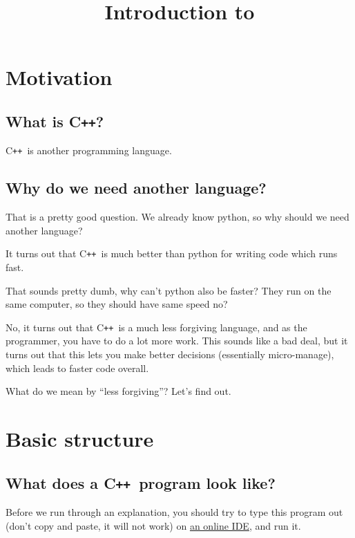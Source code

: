 \documentclass{article}
\title{Introduction to \CC}
\newcommand{\CC}{C\texttt{++}}
\begin{document}
\maketitle


\section{Motivation}

\subsection{What is \CC?}
\CC\ is another programming language.

\subsection{Why do we need another language?}
That is a pretty good question.
We already know python, so why should we need another language?

It turns out that \CC\ is much better than python for writing code which runs fast.

That sounds pretty dumb, why can't python also be faster?
They run on the same computer, so they should have same speed no?

No, it turns out that \CC\ is a much less forgiving language, and as the programmer,
you have to do a lot more work. This sounds like a bad deal, but it turns out that
this lets you make better decisions (essentially micro-manage), which leads to faster
code overall.

What do we mean by ``less forgiving''?
Let's find out.

\section{Basic structure}

\subsection{What does a \CC\ program look like?}



Before we run through an explanation, you should try to type this program out
(don't copy and paste, it will not work)
on \href{http://codechef.com/ide}{an online IDE}, and run it.
\end{document}
